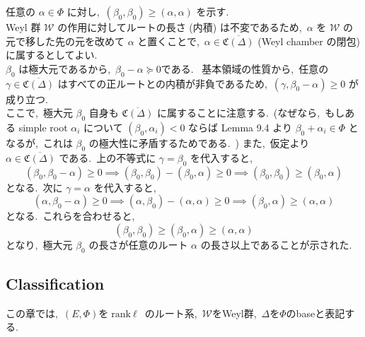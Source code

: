 \documentclass[uplatex,dvipdfmx]{jsarticle}
\begin{document}
\begin{myproof}
    任意の $\alpha \in \Phi$ に対し,~$(\beta_0, \beta_0) \ge (\alpha, \alpha)$ を示す.~\\
    Weyl 群 $\mathcal{W}$ の作用に対してルートの長さ (内積) は不変であるため,~$\alpha$ を $\mathcal{W} $ の元で移した先の元を改めて $\alpha$ と置くことで,~$\alpha \in \overline{\mathfrak{C}(\Delta)}$ (Weyl chamber の閉包) に属するとしてよい.~\\
    $\beta_0$ は極大元であるから,~$\beta_0 - \alpha \succeq 0$である.~
    基本領域の性質から,~任意の $\gamma \in \overline{\mathfrak{C}(\Delta)}$ はすべての正ルートとの内積が非負であるため,~$(\gamma, \beta_0 - \alpha) \ge 0$ が成り立つ.~\\
    ここで,~極大元 $\beta_0$ 自身も $\overline{\mathfrak{C}(\Delta)}$ に属することに注意する.~(なぜなら,~もしある simple root $\alpha_i$ について $(\beta_0, \alpha_i) < 0$ ならば Lemma 9.4 より $\beta_0 + \alpha_i \in \Phi$ となるが,~これは $\beta_0$ の極大性に矛盾するためである.~)
    また,~仮定より $\alpha \in \overline{\mathfrak{C}(\Delta)}$ である.~上の不等式に $\gamma = \beta_0$ を代入すると,
    \begin{equation*}
        (\beta_0, \beta_0 - \alpha) \ge 0 \implies (\beta_0, \beta_0) - (\beta_0, \alpha) \ge 0 \implies (\beta_0, \beta_0) \ge (\beta_0, \alpha)
    \end{equation*}
    となる.~次に $\gamma = \alpha$ を代入すると,
    \begin{equation*}
        (\alpha, \beta_0 - \alpha) \ge 0 \implies (\alpha, \beta_0) - (\alpha, \alpha) \ge 0 \implies (\beta_0, \alpha) \ge (\alpha, \alpha)
    \end{equation*}
    となる.~これらを合わせると,
    \begin{equation*}
        (\beta_0, \beta_0) \ge (\beta_0, \alpha) \ge (\alpha, \alpha)
    \end{equation*}
    となり,~極大元 $\beta_0$ の長さが任意のルート $\alpha$ の長さ以上であることが示された.
\end{myproof}
\newpage

\subsection{Classification}
この章では,~$(E,\Phi)$を$\text{rank}~\ell$~のルート系,~$\mathcal{W}$をWeyl群,~$\Delta$を$\Phi$のbaseと表記する.
\end{document}
